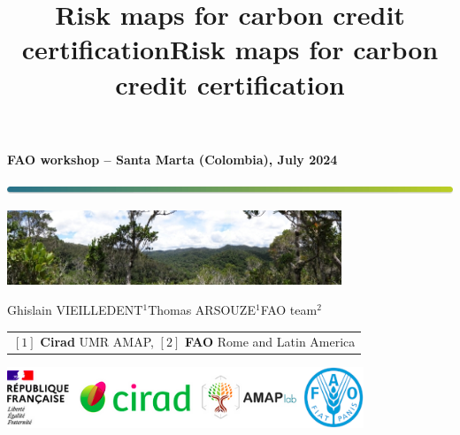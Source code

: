 \documentclass[10pt,table,dvipsnames,compress]{beamer}
\date{}
\title{Risk maps for carbon credit certification}
\title[riskmaps]{Risk maps for carbon credit certification}
\begin{document}

{
  \begin{frame}
  \begin{center}
  \small{\textbf{FAO workshop -- Santa Marta (Colombia), July 2024}}
  \end{center}
  \vspace{-0.5cm}
  \titlepage %
  \vspace{-3cm}
  \begin{center}
    \includegraphics[width=\textwidth]{figs/Barre_couleur}
    
    \vspace{0.25cm}
    
    \includegraphics[width=10cm]{figs/Banniere}
    
    \small{Ghislain VIEILLEDENT$^{1}$\hspace{0.25cm}Thomas ARSOUZE$^{1}$\hspace{0.25cm}FAO team$^{2}$}
      
    \vspace{0.25cm}
    
    {\scriptsize
      \begin{tabular}{l}
        $[1]$ \textbf{Cirad} UMR AMAP, $[2]$ \textbf{FAO} Rome and Latin America
      \end{tabular}
    }
    
    \includegraphics[width=0.8\textwidth]{figs/partners_logos}
    
  \end{center}
  \end{frame}
}
\end{document}
